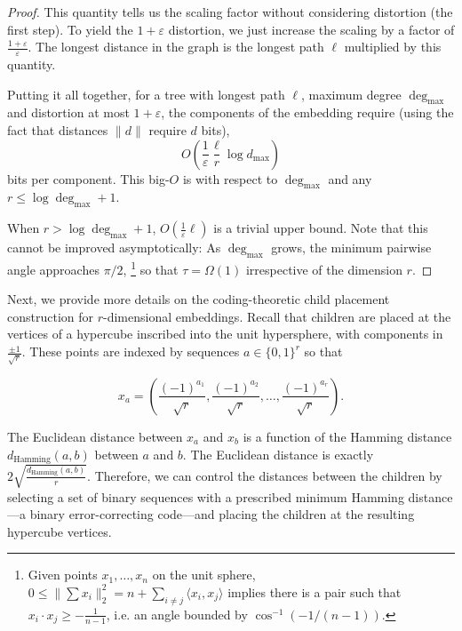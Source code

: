\begin{proof}
 This quantity tells us the scaling factor without considering distortion (the first step).
 To yield the $1+\varepsilon$ distortion, we just increase the scaling by a factor of $\frac{1+\varepsilon}{\varepsilon}$.
 The longest distance in the graph is the longest path $\ell$ multiplied by this quantity.
    
Putting it all together, for a tree with longest path $\ell$, maximum degree $\operatorname{deg}_{\max}$ and distortion at most $1+\varepsilon$, the components of the embedding require (using the fact that distances $\|d\|$ require $d$ bits),
\[ O\left(      \frac{1}{\varepsilon}\frac{\ell}{r} \log d_{\max}  \right)\]
bits per component. %
This big-$O$ is with respect to $\operatorname{deg}_{\max}$ and any $r \le \log \operatorname{deg}_{\max} + 1$.


When $r > \log \operatorname{deg}_{\max} + 1$, $O\left( \frac{1}{\varepsilon}{\ell} \right)$ is a trivial upper bound.
Note that this cannot be improved asymptotically: As $\operatorname{deg}_{\max}$ grows, the minimum pairwise angle approaches $\pi/2$,%
\footnote{Given points $x_1, \dots, x_n$ on the unit sphere, $0 \le \| \sum x_i \|_2^2 = n + \sum_{i\neq j} \langle x_i, x_j \rangle$ implies there is a pair such that $x_i \cdot x_j \ge -\frac{1}{n-1}$, i.e. an angle bounded by $\cos^{-1}(-1/(n-1))$.}
so that $\tau = \Omega(1)$ irrespective of the dimension $r$.
\end{proof}

Next, we provide more details on the coding-theoretic child placement construction for $r$-dimensional embeddings. Recall that children are placed at the vertices of a hypercube inscribed into the unit hypersphere, with components in $\frac{\pm 1}{\sqrt{r}}$. These points are indexed by sequences ${a} \in \{0,1\}^r$ so that

\[{ x}_{ a} = \left( \frac{(-1)^{a_1}}{\sqrt{r}}, \frac{(-1)^{a_2}}{\sqrt{r}} , \ldots, \frac{(-1)^{a_r}}{\sqrt{r}} \right).\]

The Euclidean distance between ${ x}_{ a}$ and ${ x}_{ b}$ is a function of the Hamming distance $d_{\text{Hamming}}({ a},{ b})$ between ${ a}$ and ${ b}$. The Euclidean distance is exactly $2\sqrt{\frac{d_{\text{Hamming}}({ a},{ b})}{r}}$. Therefore, we can control the distances between the children by selecting a set of binary sequences with a prescribed minimum Hamming distance---a binary error-correcting code---and placing the children at the resulting hypercube vertices.

